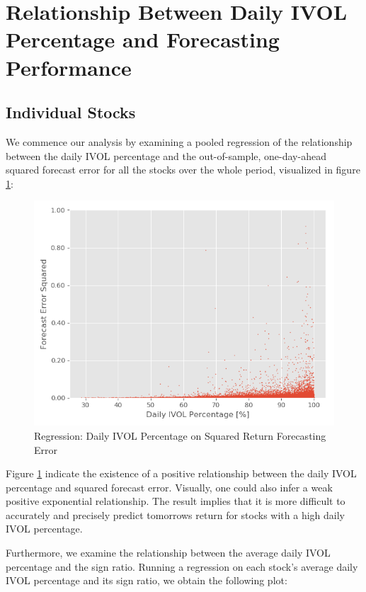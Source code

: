 \section{Relationship Between Daily IVOL Percentage and Forecasting Performance}

\subsection{Individual Stocks}

We commence our analysis by examining a pooled regression of the relationship between the daily IVOL percentage and the out-of-sample, one-day-ahead squared forecast error for all the stocks over the whole period, visualized in figure \ref{Scatter regression}: 

\begin{figure}[h]
    \centering
    \includegraphics[scale = 0.5]{Plot/ScatterRegression.png}
    \caption{Regression: Daily IVOL Percentage on Squared Return Forecasting Error}
    \label{Scatter regression}
\end{figure}

\newpage

Figure \ref{Scatter regression} indicate the existence of a positive relationship between the daily IVOL percentage and squared forecast error. Visually, one could also infer a weak positive exponential relationship. The result implies that it is more difficult to accurately and precisely predict tomorrows return for stocks with a high daily IVOL percentage.

Furthermore, we examine the relationship between the average daily IVOL percentage and the sign ratio. Running a regression on each stock's average daily IVOL percentage and its sign ratio, we obtain the following plot: 

